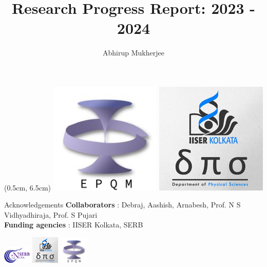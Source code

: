 \documentclass[11pt,aspectratio=169]{beamer}
\title{Research Progress Report: 2023 - 2024}
\author{Abhirup Mukherjee}
\institute{
Department of Physical Sciences, IISER Kolkata, Mohanpur}
\newcommand\focus[1]{%
	{\alert{\textbf{#1}}}
}
\begin{document}
\centering

\begin{frame}
\maketitle

\begin{textblock*}{0.3\textwidth}(0.5cm, 6.5cm)
	\includegraphics[width=0.4\textwidth]{epqm_logo_mod.jpeg}
	\hspace*{\fill}
	\includegraphics[width=0.4\textwidth]{dps_logo.jpeg}
\end{textblock*}
\hspace*{\fill}
\end{frame}

\begin{frame}{Acknowledgements}
	\flushleft
	\hspace*{20pt}
	\focus{Collaborators}: Debraj, Aashish, Arnabesh, Prof. N S Vidhyadhiraja, Prof. S Pujari\\
	\hspace*{20pt}
	\focus{Funding agencies}: IISER Kolkata, SERB
	\vspace*{\fill}

	\hspace*{\fill}
	\includegraphics[width=0.1\textwidth]{SERB.png}
	\hspace*{\fill}
	\includegraphics[width=0.1\textwidth]{dps_logo.jpeg}
	\hspace*{\fill}
	\includegraphics[width=0.1\textwidth]{epqm_logo_mod.jpeg}
	\hspace*{\fill}
\end{frame}
\end{document}
